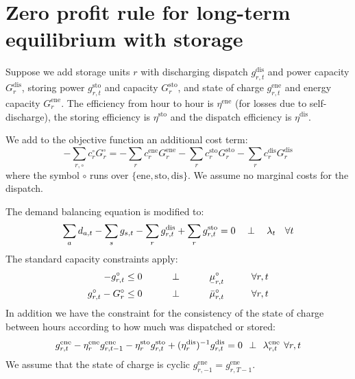 \documentclass[final,3p,times]{elsarticle}
\newcommand{\ubar}[1]{\text{\b{$#1$}}}
\def\l{\lambda}
\begin{document}
\appendix


\section{Zero profit rule for long-term equilibrium with storage}\label{sec:storage}


Suppose we add storage units $r$ with discharging dispatch $g^{\textrm{dis}}_{r,t}$ and power capacity $G^{\textrm{dis}}_{r}$, storing power $g^{\textrm{sto}}_{r,t}$ and capacity $G^{\textrm{sto}}_{r}$, and state of charge $g^{\textrm{ene}}_{r,t}$ and energy capacity $G^{\textrm{ene}}_{r}$. The efficiency from hour to hour is $\eta^{\textrm{ene}}$ (for losses due to self-discharge), the storing efficiency is $\eta^{\textrm{sto}}$ and the dispatch efficiency is $\eta^{\textrm{dis}}$.

We add to the objective function an additional cost term:
\begin{equation*}
  -\sum_{r,\circ} c^\circ_r G^\circ_r =  -\sum_r c^{\textrm{ene}}_r G^{\textrm{ene}}_r -\sum_r c^{\textrm{sto}}_r G^{\textrm{sto}}_r -\sum_r c^{\textrm{dis}}_r G^{\textrm{dis}}_r
\end{equation*}
where the symbol $\circ$ runs over $\{\textrm{ene},\textrm{sto},\textrm{dis}\}$. We assume no marginal costs for the dispatch.

The demand balancing equation is modified to:
\begin{equation}
   \sum_a d_{a,t} - \sum_s g_{s,t} - \sum_r g^{\textrm{dis}}_{r,t}  + \sum_r g^{\textrm{sto}}_{r,t}  =  0 \hspace{0.34cm}\perp \hspace{0.34cm} \l_t \hspace{0.34cm} \forall t
\end{equation}
The standard capacity constraints apply:
\begin{align}
    -g^\circ_{r,t}\leq 0 \hspace{1cm}\perp \hspace{1cm} \ubar{\mu}^\circ_{r,t} \hspace{1cm} \forall r,t  \label{eq:storlower}\\
    g^\circ_{r,t} - G^\circ_r \leq 0 \hspace{1cm}\perp \hspace{1cm} \bar{\mu}^\circ_{r,t} \hspace{1cm} \forall r,t \label{eq:storupper}
\end{align}
In addition we have the constraint for the consistency of the state of charge between hours according to how much was dispatched or stored:
\begin{equation}
    g^{\textrm{ene}}_{r,t}- \eta^{\textrm{ene}}_r g^{\textrm{ene}}_{r,t-1} - \eta^{\textrm{sto}}_r g^{\textrm{sto}}_{r,t} + (\eta^{\textrm{dis}}_r)^{-1} g^{\textrm{dis}}_{r,t}  =  0 \hspace{0.14cm}\perp \hspace{0.14cm} \l^{\textrm{ene}}_{r,t} \hspace{0.14cm} \forall r,t  \label{eq:storsoc}
\end{equation}
We assume that the state of charge is cyclic $g^{\textrm{ene}}_{r,-1} = g^{\textrm{ene}}_{r,T-1}$.
\end{document}
